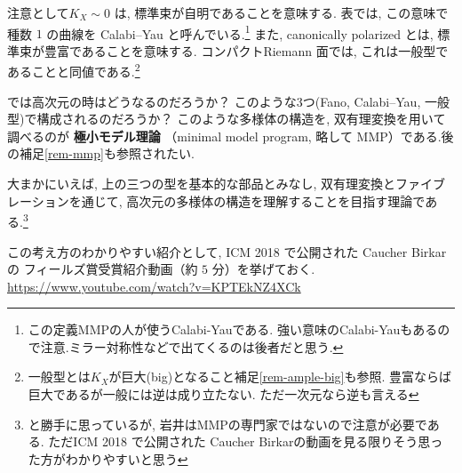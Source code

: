 \documentclass[dvipdfmx,a4paper,11pt]{article} %
\theoremstyle{definition}
\numberwithin{equation}{section}
\begin{document}
\begin{center}
{%
}
\end{center}
注意として$K_X\sim0$ は, 標準束が自明であることを意味する.
表では, この意味で種数 $1$ の曲線を
Calabi--Yau と呼んでいる.\footnote{この定義MMPの人が使うCalabi-Yauである. 強い意味のCalabi-Yauもあるので注意.ミラー対称性などで出てくるのは後者だと思う. }
また, canonically polarized とは, 
標準束が豊富であることを意味する.
コンパクトRiemann 面では, これは一般型であることと同値である.\footnote{一般型とは$K_X$が巨大(big)となること補足\ref{rem-ample-big}も参照. 豊富ならば巨大であるが一般には逆は成り立たない. ただ一次元なら逆も言える}

では高次元の時はどうなるのだろうか？
このような3つ(Fano, Calabi--Yau, 一般型)で構成されるのだろうか？
このような多様体の構造を, 双有理変換を用いて調べるのが
\textbf{極小モデル理論}
（minimal model program, 略して MMP）である.後の補足\ref{rem-mmp}も参照されたい.

大まかにいえば, 上の三つの型を基本的な部品とみなし,
双有理変換とファイブレーションを通じて,
高次元の多様体の構造を理解することを目指す理論である.\footnote{と勝手に思っているが, 岩井はMMPの専門家ではないので注意が必要である. ただICM 2018 で公開された Caucher Birkarの動画を見る限りそう思った方がわかりやすいと思う}

この考え方のわかりやすい紹介として,
ICM 2018 で公開された Caucher Birkar の
フィールズ賞受賞紹介動画（約 $5$ 分）を挙げておく.
\url{https://www.youtube.com/watch?v=KPTEkNZ4XCk}
\end{document}
